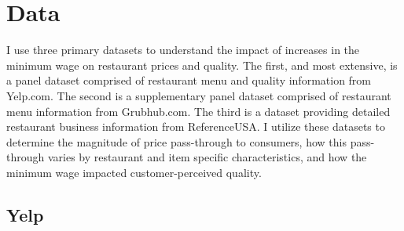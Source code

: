\documentclass[11pt]{article}
\begin{document}
\section{Data}

I use three primary datasets to understand the impact of increases in the minimum wage on restaurant prices and quality. The first, and most extensive, is a panel dataset comprised of restaurant menu and quality information from Yelp.com. The second is a supplementary panel dataset comprised of restaurant menu information from Grubhub.com. The third is a dataset providing detailed restaurant business information from ReferenceUSA. I utilize these datasets to determine the magnitude of price pass-through to consumers, how this pass-through varies by restaurant and item specific characteristics, and how the minimum wage impacted customer-perceived quality.

\subsection{Yelp}
\end{document}
